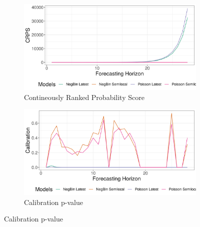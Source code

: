 \begin{figure}[H]
\begin{subfigure}{0.5\textwidth}
  \centering
  \includegraphics[width=\linewidth]{../output/Kayna_crps.png}  
  \caption{Contineously Ranked Probability Score}
  \label{fig:sub-first}
\end{subfigure}
\begin{subfigure}{0.5\textwidth}
  \centering
  \includegraphics[width=\linewidth]{../output/Kayna_calibration.png}  
  \caption{Calibration p-value}
  \label{fig:sub-second}
\end{subfigure}


\end{figure}

